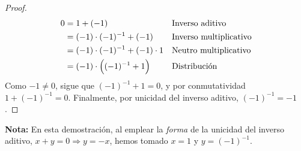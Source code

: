 \documentclass[11pt]{article}
\begin{document}
\begin{enumerate}[label=\alph*)]
\begin{proof}
    \vspace{-1em} \begin{align*}
        0 &= 1 + (-1) && \text{Inverso aditivo}\\
        &= (-1)\cdot (-1)^{-1} + (-1) && \text{Inverso multiplicativo}\\
        &= (-1)\cdot (-1)^{-1} + (-1) \cdot 1 && \text{Neutro multiplicativo}\\
        &= (-1) \cdot \Bigl((-1)^{-1} + 1\Bigr) && \text{Distribución}
    \end{align*} Como $-1\neq 0$, sigue que $(-1)^{-1} + 1=0$, y por conmutatividad $1+(-1)^{-1}=0$. Finalmente, por unicidad del inverso aditivo, $(-1)^{-1}=-1$.
    \end{proof} \vspace{-1em}
    \textbf{Nota:} En esta demostración, al emplear la \textit{forma} de la unicidad del inverso aditivo, $x+y=0 \Longrightarrow y=-x$, hemos tomado $x=1$ y $y=(-1)^{-1}$.


\end{enumerate}
\end{document}

